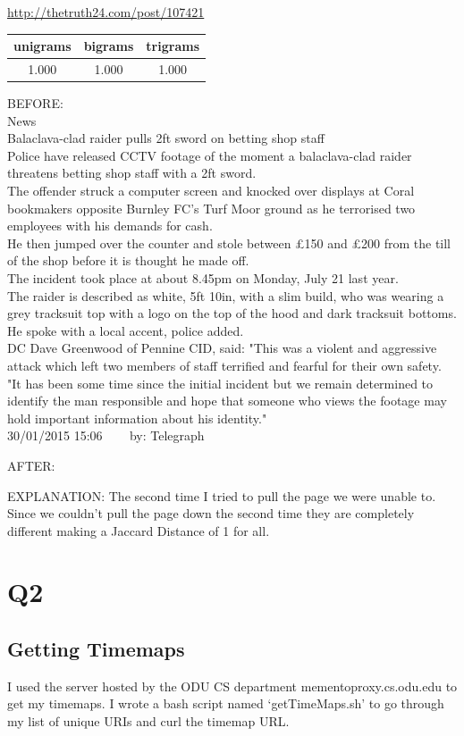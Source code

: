 \documentclass[12pt]{article}
\begin{document}
\url{http://thetruth24.com/post/107421}\\
\begin{tabular}{|c|c|c|}
    \hline
    unigrams & bigrams & trigrams\\
    \hline
    1.000 & 1.000 & 1.000\\
    \hline
\end{tabular}

BEFORE:\\
News\\
Balaclava-clad raider pulls 2ft sword on betting shop staff\\
Police have released CCTV footage of the moment a balaclava-clad raider    threatens betting shop staff with a 2ft sword.\\
The offender struck a computer screen and knocked over displays at Coral    bookmakers opposite Burnley FC's Turf Moor ground as he terrorised two    employees with his demands for cash.\\
He then jumped over the counter and stole between £150 and £200 from the till    of the shop before it is thought he made off.\\
The incident took place at about 8.45pm on Monday, July 21 last year.\\
The raider is described as white, 5ft 10in, with a slim build, who was wearing    a grey tracksuit top with a logo on the top of the hood and dark tracksuit    bottoms.\\
He spoke with a local accent, police added.\\
DC Dave Greenwood of Pennine CID, said: "This was a violent and    aggressive attack which left two members of staff terrified and fearful for    their own safety.\\
"It has been some time since the initial incident but we remain    determined to identify the man responsible and hope that someone who views    the footage may hold important information about his identity."\\
30/01/2015 15:06     by: Telegraph

AFTER:

EXPLANATION: The second time I tried to pull the page we were unable to.  Since we couldn't pull the page down the second time they are completely different making a Jaccard Distance of 1 for all.

\section{Q2}
\subsection{Getting Timemaps}
I used the server hosted by the ODU CS department mementoproxy.cs.odu.edu to get my timemaps.  I wrote a bash script named `getTimeMaps.sh' to go through my list of unique URIs and curl the timemap URL.
\end{document}
